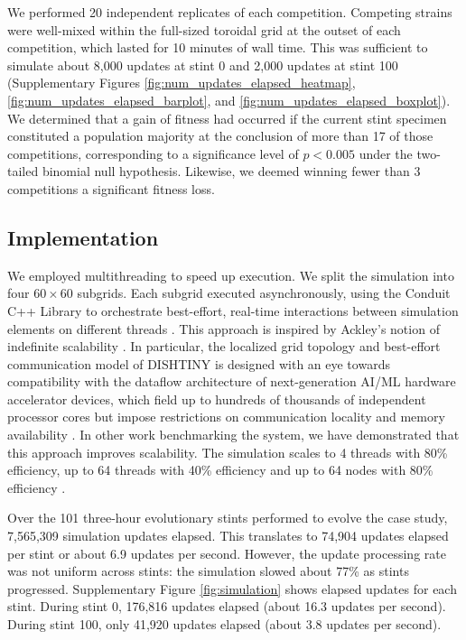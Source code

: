We performed 20 independent replicates of each competition.
Competing strains were well-mixed within the full-sized toroidal grid at the outset of each competition, which lasted for 10 minutes of wall time.
This was sufficient to simulate about 8,000 updates at stint 0 and 2,000 updates at stint 100 (Supplementary Figures \ref{fig:num_updates_elapsed_heatmap}, \ref{fig:num_updates_elapsed_barplot}, and \ref{fig:num_updates_elapsed_boxplot}).
We determined that a gain of fitness had occurred if the current stint specimen constituted a population majority at the conclusion of more than 17 of those competitions, corresponding to a significance level of $p < 0.005$ under the two-tailed binomial null hypothesis.
Likewise, we deemed winning fewer than 3 competitions a significant fitness loss.


\subsection{Implementation}

We employed multithreading to speed up execution.
We split the simulation into four $60\times60$ subgrids.
Each subgrid executed asynchronously, using the Conduit C++ Library  to orchestrate best-effort, real-time interactions between simulation elements on different threads .
This approach is inspired by Ackley's notion of indefinite scalability \citep{ackley2014indefinitely}.
In particular, the localized grid topology and best-effort communication model of DISHTINY is designed with an eye towards compatibility  with the dataflow architecture of next-generation AI/ML hardware accelerator devices, which field up to hundreds of thousands of independent processor cores but impose restrictions on communication locality and memory availability \citep{lauterbach2021path,moreno2024trackable}.
In other work benchmarking the system, we have demonstrated that this approach improves scalability.
The simulation scales to 4 threads with 80\% efficiency, up to 64 threads with 40\% efficiency and up to 64 nodes with 80\% efficiency .

Over the 101 three-hour evolutionary stints performed to evolve the case study, 7,565,309 simulation updates elapsed.
This translates to 74,904 updates elapsed per stint or about 6.9 updates per second.
However, the update processing rate was not uniform across stints: the simulation slowed about 77\% as stints progressed.
Supplementary Figure \ref{fig:simulation} shows elapsed updates for each stint.
During stint 0, 176,816 updates elapsed (about 16.3 updates per second).
During stint 100, only 41,920 updates elapsed (about 3.8 updates per second).

